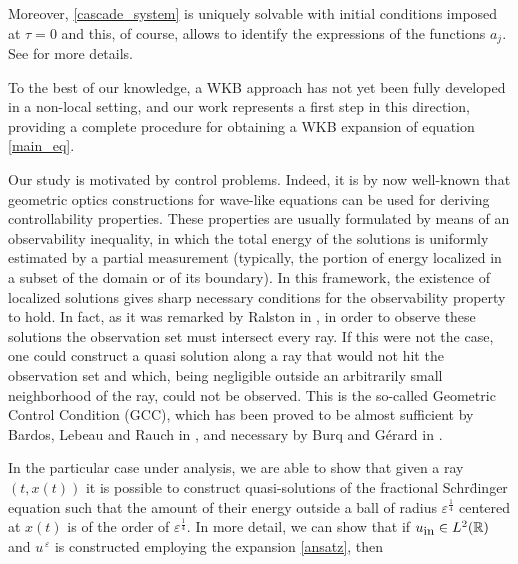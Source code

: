 \documentclass[10pt]{article}
\newcommand{\ue}[1]{#1^{\,\varepsilon}}
\newcommand{\RR}{\mathbb{R}}
\newcommand{\uin}{u_{\textrm{\small in}}}
\begin{document}
Moreover, \eqref{cascade_system} is uniquely solvable with initial conditions imposed at $\tau = 0$ and this, of course, allows to identify the expressions of the functions $a_j$. See \cite{biccari2018wkb} for more details.

To the best of our knowledge, a WKB approach has not yet been fully developed in a non-local setting, and our work represents a first step in this direction, providing a complete procedure for obtaining a WKB expansion of equation \eqref{main_eq}. 

Our study is motivated by control problems. Indeed, it is by now well-known that geometric optics constructions for wave-like equations can be used for deriving controllability properties. These properties are usually formulated by means of an observability inequality, in which the total energy of the solutions is uniformly estimated by a partial measurement (typically, the portion of energy localized in a subset of the domain or of its boundary). In this framework, the existence of localized solutions gives sharp necessary conditions for the observability property to hold. In fact, as it was remarked by Ralston in \cite{ralston1982gaussian}, in order to observe these solutions the observation set must intersect every ray. If this were not the case, one could construct a quasi solution along a ray that would not hit the observation set and which, being negligible outside an arbitrarily small neighborhood of the ray, could not be observed. This is the so-called Geometric Control Condition (GCC), which has been proved to be almost sufficient by Bardos, Lebeau and Rauch in \cite{bardos1992sharp}, and necessary by Burq and Gérard in \cite{burq1997condition}.

In the particular case under analysis, we are able to show that given a ray $(t,x(t))$ it is possible to construct quasi-solutions of the fractional Schr\"dinger equation such that the amount of their energy outside a ball of radius $\varepsilon^{\frac 14}$ centered at $x(t)$ is of the order of $\varepsilon^{\frac 14}$. In more detail, we can show that if $\uin\in L^2(\RR)$ and $\ue{u}$ is constructed employing the expansion \eqref{ansatz}, then
\end{document}
